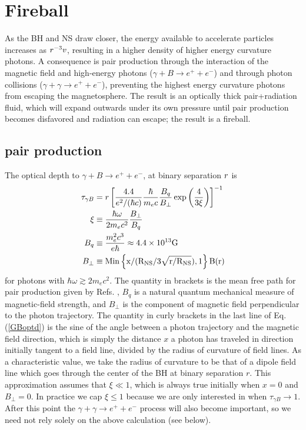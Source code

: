  
 

 




\section{Fireball}
\label{Fireball}
As the BH and NS draw closer, the energy available to accelerate
particles increases as $r^{-3}v$, resulting in a higher density of
higher energy curvature photons. A consequence is pair production
through the interaction of the magnetic field and high-energy photons
($\gamma + B \rightarrow e^{+} + e^{-}$) and through photon collisions
($\gamma + \gamma \rightarrow e^{+} + e^{-}$), preventing the highest
energy curvature photons from escaping the magnetosphere.  The result
is an optically thick pair+radiation fluid, which will expand outwards
under its own pressure until pair production becomes disfavored and
radiation can escape; the result is a fireball.

\subsection{pair production}
The optical depth to $\gamma + B \rightarrow e^{+} + e^{-}$, at binary
separation $r$ is
\begin{align}
\label{GBoptd}
\tau_{\gamma B} &= \Rbin \left[\frac{4.4}{e^2 / (\hbar c)}
  \frac{\hbar}{m_e c} \frac{B_q}{B_{\perp}} \exp{\left(\frac{4}{3 \xi}\right)} \right]^{-1}  \\ 
%      
\xi &\equiv \frac{\hbar \omega}{2 m_e c^2} \frac{B_\perp}{B_q} \nonumber \\ 
%
B_q & \equiv \frac{m^2_e c^3}{e \hbar} \approx 4.4 \times 10^{13} \rm{G} \nonumber \\ \nonumber
   B_{\perp} &\equiv \rm{Min}\left\{x/(\RNS/ 3\sqrt{r/\RNS}),  1 \right\} B(r)
\end{align}
for photons with $\hbar \omega \gtrsim 2 m_e c^2$. The quantity in
brackets is the mean free path for pair production given by
Refs. \cite{Erber:1966, RudSuth:1975}, $B_q$ is a natural quantum
mechanical measure of magnetic-field strength, and $B_{\perp}$ is the
component of magnetic field perpendicular to the photon trajectory. 
The quantity in curly brackets in the last line of Eq. (\ref{GBoptd}) is the 
sine of the angle between a photon trajectory and the magnetic field 
direction, which is simply the distance $x$ a photon has traveled in direction
initially tangent to a field line, divided by the radius 
of curvature of field lines. As a characteristic value, we take the radius 
of curvature to be that of a dipole field line which goes through the center 
of the BH at binary separation $r$.
This approximation assumes that $\xi \ll 1$, which is always true initially when $x=0$
and $B_{\perp} = 0$. In practice we cap $\xi\leq 1$ because we are
only interested in when $\tau_{\gamma B} \rightarrow 1$.  After this
point the $\gamma + \gamma \rightarrow e^{+} + e^{-}$ process will
also become important, so we need not rely solely on the above
calculation (see below).




